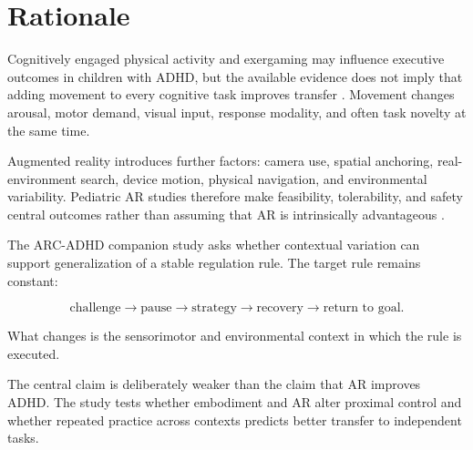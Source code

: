 \section{Rationale}

Cognitively engaged physical activity and exergaming may influence executive outcomes in children with ADHD, but the available evidence does not imply that adding movement to every cognitive task improves transfer \parencite{benzing2019exergaming,zhao2024cognitivephysical,fang2024cognitivephysical,pradana2026exergaming}. Movement changes arousal, motor demand, visual input, response modality, and often task novelty at the same time.

Augmented reality introduces further factors: camera use, spatial anchoring, real-environment search, device motion, physical navigation, and environmental variability. Pediatric AR studies therefore make feasibility, tolerability, and safety central outcomes rather than assuming that AR is intrinsically advantageous \parencite{welsby2025ar}.

The ARC-ADHD companion study asks whether contextual variation can support generalization of a stable regulation rule. The target rule remains constant:

\[
\text{challenge}
\rightarrow
\text{pause}
\rightarrow
\text{strategy}
\rightarrow
\text{recovery}
\rightarrow
\text{return to goal}.
\]

What changes is the sensorimotor and environmental context in which the rule is executed.

The central claim is deliberately weaker than the claim that AR improves ADHD. The study tests whether embodiment and AR alter proximal control and whether repeated practice across contexts predicts better transfer to independent tasks.
